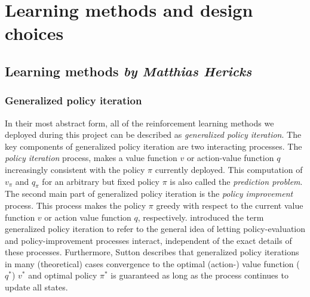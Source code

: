 \chapter{Learning methods and design choices}
\section[Learning method]{Learning methods \hfill \small \normalfont\textit{by Matthias Hericks}}

\subsection{Generalized policy iteration}

In their most abstract form, all of the reinforcement learning methods we deployed during this project can be described as \emph{generalized policy iteration}. The key components of generalized policy iteration are two interacting processes. The \emph{policy iteration} process, makes a value function $v$ or action-value function $q$ increasingly consistent with the policy $\pi$ currently deployed. This computation of $v_\pi$ and $q_\pi$ for an arbitrary but fixed policy $\pi$ is also called the \emph{prediction problem}. The second main part of generalized policy iteration is the \emph{policy improvement} process. This process makes the policy $\pi$ greedy with respect to the current value function $v$ or action value function $q$, respectively. \cite{Sutton1998} introduced the term generalized policy iteration to refer to the general idea of letting policy-evaluation and policy-improvement processes interact, independent of the exact details of these processes. Furthermore, Sutton describes that generalized policy iterations in many (theoretical) cases convergence to the optimal (action-) value function ($q^\ast$) $v^\ast$ and optimal policy $\pi^\ast$ is guaranteed as long as the process continues to update all states. 

